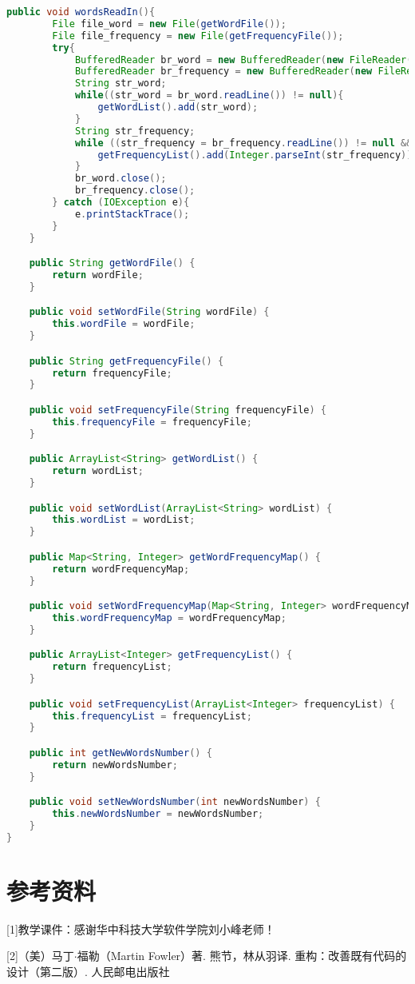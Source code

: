 \documentclass[a4paper]{article}
\begin{document}
\begin{lstlisting}[language={java}]
    public void wordsReadIn(){
        File file_word = new File(getWordFile());
        File file_frequency = new File(getFrequencyFile());
        try{
            BufferedReader br_word = new BufferedReader(new FileReader(file_word));
            BufferedReader br_frequency = new BufferedReader(new FileReader(file_frequency));
            String str_word;
            while((str_word = br_word.readLine()) != null){
                getWordList().add(str_word);
            }
            String str_frequency;
            while ((str_frequency = br_frequency.readLine()) != null && !str_frequency.equals("")){
                getFrequencyList().add(Integer.parseInt(str_frequency));
            }
            br_word.close();
            br_frequency.close();
        } catch (IOException e){
            e.printStackTrace();
        }
    }

    public String getWordFile() {
        return wordFile;
    }

    public void setWordFile(String wordFile) {
        this.wordFile = wordFile;
    }

    public String getFrequencyFile() {
        return frequencyFile;
    }

    public void setFrequencyFile(String frequencyFile) {
        this.frequencyFile = frequencyFile;
    }

    public ArrayList<String> getWordList() {
        return wordList;
    }

    public void setWordList(ArrayList<String> wordList) {
        this.wordList = wordList;
    }

    public Map<String, Integer> getWordFrequencyMap() {
        return wordFrequencyMap;
    }

    public void setWordFrequencyMap(Map<String, Integer> wordFrequencyMap) {
        this.wordFrequencyMap = wordFrequencyMap;
    }

    public ArrayList<Integer> getFrequencyList() {
        return frequencyList;
    }

    public void setFrequencyList(ArrayList<Integer> frequencyList) {
        this.frequencyList = frequencyList;
    }

    public int getNewWordsNumber() {
        return newWordsNumber;
    }

    public void setNewWordsNumber(int newWordsNumber) {
        this.newWordsNumber = newWordsNumber;
    }
}
\end{lstlisting}
\section{参考资料}
[1]教学课件：感谢华中科技大学软件学院刘小峰老师！

[2]（美）马丁$\cdot$福勒（Martin Fowler）著. 熊节，林从羽译. 重构：改善既有代码的设计（第二版）. 人民邮电出版社
\end{document}
